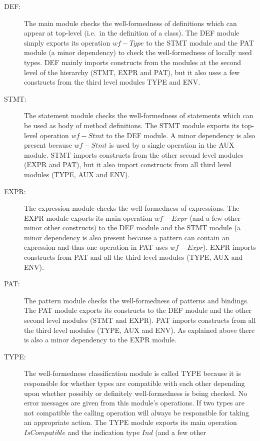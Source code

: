 \documentclass[a4paper,dvips]{article}
\begin{document}
\begin{description}
\item[DEF:] The main module checks the well-formedness of definitions
     which can appear at top-level (i.e.\ in the definition of a class).
     The DEF module simply exports its operation $wf-Type$ to the STMT
     module and the PAT module (a minor dependency) to check the
     well-formedness of locally used types. DEF mainly imports
     constructs from the modules at the second level of the hierarchy
     (STMT, EXPR and PAT), but it also uses a few constructs from the
     third level modules TYPE and ENV.
\item[STMT:] The statement module checks the well-formedness of
     statements which can be used as body of method definitions. The
     STMT module exports its top-level operation $wf-Stmt$ to
     the DEF module. A minor dependency is also
     present because $wf-Stmt$ is used by a single operation in the AUX
     module. STMT imports constructs from the other second level
     modules (EXPR and PAT), but it also import constructs from all
     third level modules (TYPE, AUX and ENV).
\item[EXPR:] The expression module checks the well-formedness of
     expressions. The EXPR module exports its main operation $wf-Expr$ (and
     a few other minor other constructs) to the DEF module and the STMT
     module (a minor dependency is also present
     because a pattern can contain an expression and thus one
     operation in PAT uses $wf-Expr$). EXPR imports constructs from
     PAT and all the third level modules (TYPE, AUX and ENV).
\item[PAT:] The pattern module checks the well-formedness of patterns
     and bindings. The PAT module exports its constructs to the DEF module
     and the other second level modules (STMT and EXPR). PAT imports
     constructs from all the third level modules (TYPE, AUX and
     ENV). As explained above there is also a minor dependency to the EXPR
     module.
\item[TYPE:] The well-formedness classification module is called TYPE
     because it is responsible for whether types are compatible with
     each other depending upon whether possibly or definitely
     well-formedness is being checked. No error messages are given
     from this module's operations. If two types are not compatible
     the calling operation will always be responsible for taking an
     appropriate action. The TYPE module exports its main operation
     $IsCompatible$ and the indication type $Ind$ (and a few other

\end{description}
\end{document}
